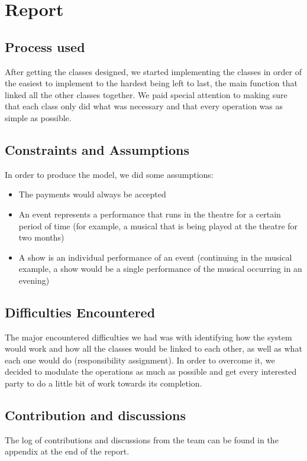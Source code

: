 \chapter{Report}


\section{Process used}
After getting the classes designed, we started implementing the classes in order of the easiest to implement to the hardest being left to last, the main function that linked all the other classes together. We paid special attention to making sure that each class only did what was necessary and that every operation was as simple as possible.

\section{Constraints and Assumptions}
In order to produce the model, we did some assumptions:
\begin{itemize}
  \item The payments would always be accepted
  \item An event represents a performance that runs in the theatre for a certain period of time (for example, a musical that is being played at the theatre for two months)
  \item A show is an individual performance of an event (continuing in the musical example, a show would be a single performance of the musical occurring in an evening)
\end{itemize}

\section{Difficulties Encountered}
The major encountered difficulties we had was with identifying how the system would work and how all the classes would be linked to each other, as well as what each one would do (responsibility assignment). In order to overcome it, we decided to modulate the operations as much as possible and get every interested party to do a little bit of work towards its completion.

\section{Contribution and discussions}
The log of contributions and discussions from the team can be found in the appendix at the end of the report.
